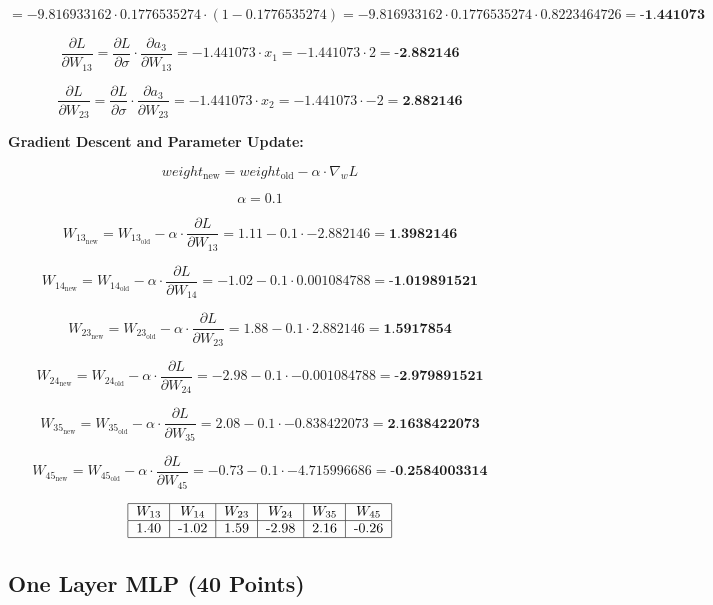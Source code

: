 \documentclass{article}
\begin{document}
\[
= -9.816933162 \cdot 0.1776535274 \cdot (1 - 0.1776535274) = -9.816933162 \cdot 0.1776535274 \cdot 0.8223464726 = \textbf{-1.441073}
\]


\[
\frac{\partial L}{\partial W_{13}} = \frac{\partial L}{\partial \sigma} \cdot \frac{\partial a_3}{\partial W_{13}} = -1.441073 \cdot x_1 = -1.441073 \cdot 2 = \textbf{-2.882146}
\]

\[
\frac{\partial L}{\partial W_{23}} = \frac{\partial L}{\partial \sigma} \cdot \frac{\partial a_3}{\partial W_{23}} = -1.441073 \cdot x_2 = -1.441073 \cdot -2 = \textbf{2.882146}
\]

\textbf{Gradient Descent and Parameter Update:}

\[
weight_{\text{new}} = weight_{\text{old}} - \alpha \cdot \nabla_w L
\]

\[
\alpha = 0.1
\]

\[
W_{13_{\text{new}}} = W_{13_{\text{old}}} - \alpha \cdot \frac{\partial L}{\partial W_{13}} = 1.11 - 0.1 \cdot -2.882146 = \textbf{1.3982146}
\]

\[
W_{14_{\text{new}}} = W_{14_{\text{old}}} - \alpha \cdot \frac{\partial L}{\partial W_{14}} = -1.02 - 0.1 \cdot 0.001084788 = \textbf{-1.019891521}
\]

\[
W_{23_{\text{new}}} = W_{23_{\text{old}}} - \alpha \cdot \frac{\partial L}{\partial W_{23}} = 1.88 - 0.1 \cdot 2.882146 = \textbf{1.5917854}
\]

\[
W_{24_{\text{new}}} = W_{24_{\text{old}}} - \alpha \cdot \frac{\partial L}{\partial W_{24}} = -2.98 - 0.1 \cdot -0.001084788 = \textbf{-2.979891521}
\]

\[
W_{35_{\text{new}}} = W_{35_{\text{old}}} - \alpha \cdot \frac{\partial L}{\partial W_{35}} = 2.08 - 0.1 \cdot -0.838422073 = \textbf{2.1638422073}
\]

\[
W_{45_{\text{new}}} = W_{45_{\text{old}}} - \alpha \cdot \frac{\partial L}{\partial W_{45}} = -0.73 - 0.1 \cdot -4.715996686 = \textbf{-0.2584003314}
\]

\[
\begin{tabular}{|c|c|c|c|c|c|}
\hline
$W_{13}$ & $W_{14}$ & $W_{23}$ & $W_{24}$ & $W_{35}$ & $W_{45}$ \\ \hline
1.40   & -1.02    & 1.59    & -2.98    & 2.16   &  -0.26  \\ \hline
\end{tabular}
\]

\subsection{One Layer MLP (40 Points)}
\end{document}
